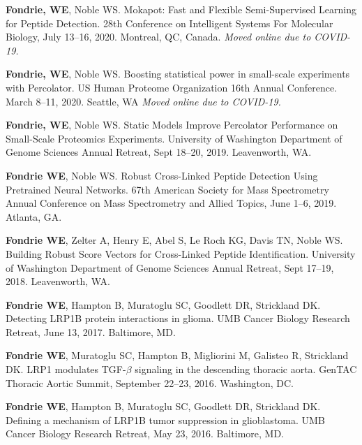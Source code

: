 \documentclass{article}
\newcommand{\mysection}[1]{\vspace{1ex {\bf \large \textrm{#1}} \quad
    \hrulefill}}
\begin{document}
\mysection{Poster Presentations}
\begin{etaremune}
  \item {\bf Fondrie, WE}, Noble WS. Mokapot: Fast and Flexible Semi-Supervised
    Learning for Peptide Detection. 28th Conference on Intelligent Systems For
    Molecular Biology, July 13--16, 2020. Montreal, QC, Canada. \textit{Moved
      online due to COVID-19.}
  
  \item {\bf Fondrie, WE}, Noble WS. Boosting statistical power in small-scale
    experiments with Percolator. US Human Proteome Organization 16th Annual
    Conference. March 8--11, 2020. Seattle, WA \textit{Moved online due to
      COVID-19.}
  
  \item {\bf Fondrie, WE}, Noble WS. Static Models Improve Percolator
    Performance on Small-Scale Proteomics Experiments. University of Washington
    Department of Genome Sciences Annual Retreat, Sept 18--20, 2019.
    Leavenworth, WA.
  
  \item {\bf Fondrie WE}, Noble WS. Robust Cross-Linked Peptide Detection Using
    Pretrained Neural Networks. 67th American Society for Mass Spectrometry
    Annual Conference on Mass Spectrometry and Allied Topics, June 1--6, 2019.
    Atlanta, GA.

  \item {\bf Fondrie WE}, Zelter A, Henry E, Abel S, Le Roch KG, Davis TN, Noble
    WS. Building Robust Score Vectors for Cross-Linked Peptide Identification.
    University of Washington Department of Genome Sciences Annual Retreat, Sept
    17--19, 2018. Leavenworth, WA.

  \item {\bf Fondrie WE}, Hampton B, Muratoglu SC, Goodlett DR, Strickland DK.
    Detecting LRP1B protein interactions in glioma. UMB Cancer Biology Research
    Retreat, June 13, 2017. Baltimore, MD.

  \item {\bf Fondrie WE}, Muratoglu SC, Hampton B, Migliorini M, Galisteo R,
    Strickland DK. LRP1 modulates TGF-$\beta$ signaling in the descending
    thoracic aorta. GenTAC Thoracic Aortic Summit, September 22--23, 2016.
    Washington, DC.

  \item {\bf Fondrie WE}, Hampton B, Muratoglu SC, Goodlett DR, Strickland DK.
    Defining a mechanism of LRP1B tumor suppression in glioblastoma. UMB Cancer
    Biology Research Retreat, May 23, 2016. Baltimore, MD.


\end{etaremune}
\end{document}
